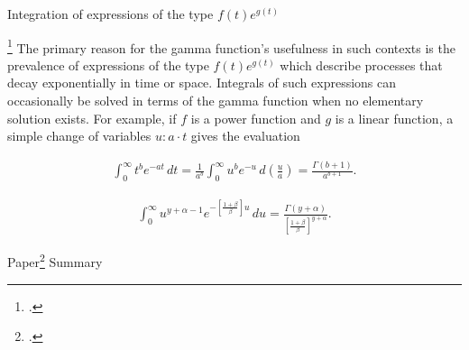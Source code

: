 \documentclass[UTF8,a4paper,10pt]{article}
\begin{document}
\begin{mybox}{Integration of expressions of the type \(f(t)e^{g(t)}\)}

  \Footcite{wiki_gamma} 
  The primary reason for the gamma function's usefulness in such contexts is the prevalence of expressions of the type 
  \(f(t)e^{g(t)}\) which describe processes that decay exponentially in time or space. Integrals of such expressions can occasionally be solved in terms of the gamma function when no elementary solution exists. For example, if \(f\) is a power function and \(g\) is a linear function, a simple change of variables \(u:a\cdot t\)  gives the evaluation

  \begin{align*}
    \int_{0}^{\infty}t^{b}e^{-at}\,dt = \frac{1}{a^b}\int_{0}^{\infty}u^{b}e^{-u}\,d\left(\frac{u}{a}\right) = \frac{\Gamma(b+1)}{a^{b+1}}.
  \end{align*}

  \dotfill

\begin{align*}
  \int_{0}^{\infty}u^{y+\alpha-1}e^{-\left[\frac{1+\beta}{\beta}\right]u}\,du = \frac{\Gamma(y+\alpha)}{\left[\frac{1+\beta}{\beta}\right]^{y+\alpha}}.
\end{align*}

\end{mybox}

\pagebreak


Paper\Footcite{Pawitan1993} Summary
\end{document}
